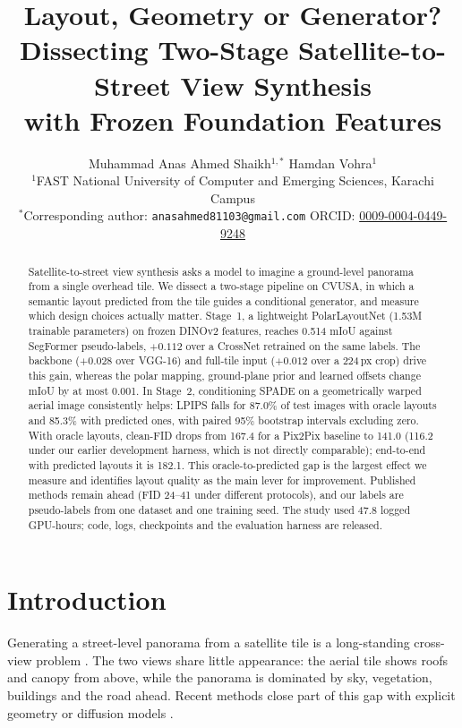 \documentclass[11pt]{article}
\title{Layout, Geometry or Generator?\\
Dissecting Two-Stage Satellite-to-Street View Synthesis\\
with Frozen Foundation Features}
\author{%
  {\normalsize Muhammad Anas Ahmed Shaikh$^{1,\ast}$}\quad
  {\normalsize Hamdan Vohra$^{1}$}\\[5pt]
  \small $^{1}$FAST National University of Computer and Emerging Sciences, Karachi Campus\\[3pt]
  \small $^{\ast}$Corresponding author:
  \texttt{anasahmed81103@gmail.com}\quad
  ORCID: \href{https://orcid.org/0009-0004-0449-9248}{0009-0004-0449-9248}%
}
\date{}
\begin{document}
\maketitle

\begin{abstract}
Satellite-to-street view synthesis asks a model to imagine a ground-level panorama from a single overhead tile.
We dissect a two-stage pipeline on CVUSA, in which a semantic layout predicted from the tile guides a
conditional generator, and measure which design choices actually matter. Stage~1, a lightweight PolarLayoutNet
(1.53M trainable parameters) on frozen DINOv2 features, reaches 0.514 mIoU against SegFormer pseudo-labels,
$+0.112$ over a CrossNet retrained on the same labels. The backbone ($+0.028$ over VGG-16) and full-tile input
($+0.012$ over a 224\,px crop) drive this gain, whereas the polar mapping, ground-plane prior and learned
offsets change mIoU by at most 0.001. In Stage~2, conditioning SPADE on a geometrically warped aerial image
consistently helps: LPIPS falls for 87.0\% of test images with oracle layouts and 85.3\% with predicted ones,
with paired 95\% bootstrap intervals excluding zero. With oracle layouts, clean-FID drops from 167.4 for a
Pix2Pix baseline to 141.0 (116.2 under our earlier development harness, which is not directly comparable);
end-to-end with predicted layouts it is 182.1. This oracle-to-predicted gap is the largest effect we measure
and identifies layout quality as the main lever for improvement. Published methods remain ahead (FID 24--41
under different protocols), and our labels are pseudo-labels from one dataset and one training seed. The
study used 47.8 logged GPU-hours; code, logs, checkpoints and the evaluation harness are released.
\end{abstract}

\section{Introduction}
\label{sec:intro}

Generating a street-level panorama from a satellite tile is a long-standing cross-view problem
\cite{zhai2017crossnet,regmi2018crossview,tang2019selectiongan}. The two views share little appearance: the
aerial tile shows roofs and canopy from above, while the panorama is dominated by sky, vegetation, buildings and the road
ahead. Recent methods close part of this gap with explicit geometry \cite{shi2022s2sp,qian2023sat2density}
or diffusion models \cite{li2024crossviewdiff}.
\end{document}
